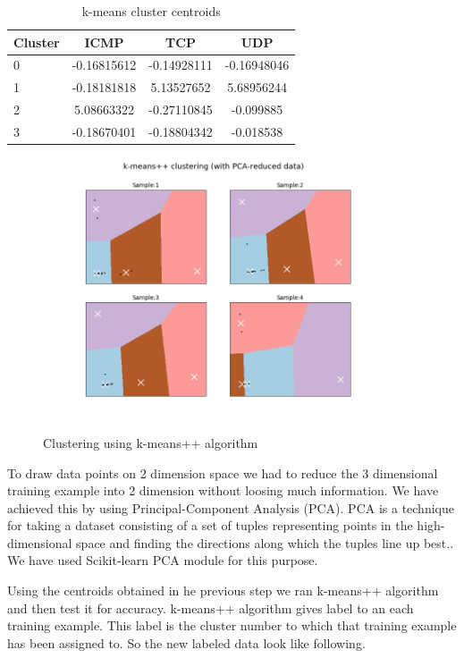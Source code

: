 \documentclass[12pt,oneside,a4paper]{article}
\begin{document}
\begin{table}[H]
\centering
  \begin{tabular}{ l | c  c  c }
    Cluster      & ICMP  & TCP  & UDP \\
    \hline
    0         &{-0.16815612}       &{-0.14928111}    &{-0.16948046} \\
    1         &{-0.18181818}       &{5.13527652}     &{5.68956244} \\
    2         &{5.08663322}        &{-0.27110845}    &{-0.099885} \\
    3         &{-0.18670401}       &{-0.18804342}    &{-0.018538} \\
  \end{tabular}
\caption{k-means cluster centroids} \label{table:centroids}
\end{table}

\begin{figure}[H]
\centering
\includegraphics[width=0.90\textwidth]{kemans-clustering.png}
\caption{Clustering using k-means++ algorithm} \label{fig:k-means-clustering}
\end{figure}

To draw data points on 2 dimension space we had to reduce the 3 dimensional training example into 2 dimension without loosing much information. We have achieved this by using Principal-Component Analysis (PCA). PCA is a technique for taking a dataset consisting of a set of tuples representing points in the high-dimensional space and finding the directions along which the tuples line up best.\cite{pca}. We have used Scikit-learn PCA module for this purpose.

Using the centroids obtained in he previous step we ran k-means++ algorithm and then test it for accuracy. k-means++ algorithm gives label to an each training example. This label is the cluster number to which that training example has been assigned to. So the new labeled data look like following.
\end{document}
